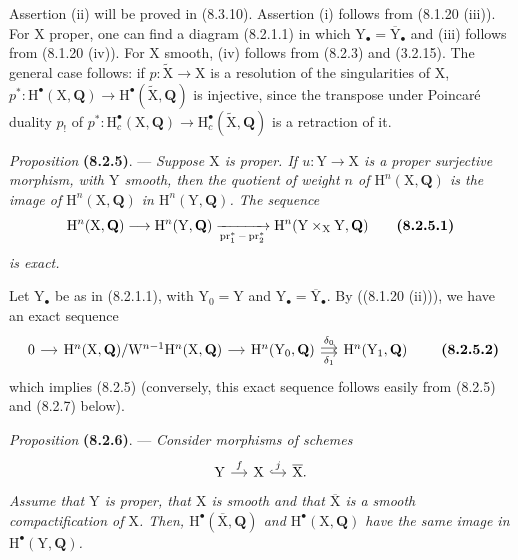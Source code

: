 \documentclass[11pt,leqno]{article}
\begin{document}
Assertion (ii) will be proved in (8.3.10). Assertion (i) follows from (8.1.20 (iii)). For \(\mathrm{X}\) proper, one can find a diagram (8.2.1.1) in which \(\mathrm{Y}_\bullet=\overline{\mathrm{Y}}_\bullet\) and (iii) follows from (8.1.20 (iv)). For \(\mathrm{X}\) smooth, (iv) follows from (8.2.3) and (3.2.15). The general case follows: if \(p:\widetilde{\mathrm{X}}\to\mathrm{X}\) is a resolution of the singularities of \(\mathrm{X}\), \(p^*:\mathrm{H}^\bullet(\mathrm{X},\mathbf{Q})\to\mathrm{H}^\bullet(\widetilde{\mathrm{X}},\mathbf{Q})\) is injective, since the transpose under Poincaré duality \(p_!\) of \(p^*:\mathrm{H}_c^\bullet(\mathrm{X},\mathbf{Q})\to\mathrm{H}_c^\bullet(\widetilde{\mathrm{X}},\mathbf{Q})\) is a retraction of it.

\textit{Proposition} \textbf{(8.2.5)}. — \textit{Suppose \(\mathrm{X}\) is proper. If \(u:\mathrm{Y}\to\mathrm{X}\) is a proper surjective morphism, with \(\mathrm{Y}\) smooth, then the quotient of weight \(n\) of \(\mathrm{H}^n(\mathrm{X},\mathbf{Q})\) is the image of \(\mathrm{H}^n(\mathrm{X},\mathbf{Q})\) in \(\mathrm{H}^n(\mathrm{Y},\mathbf{Q})\). The sequence}
\[
\mathrm{H}^n(\mathrm{X},\mathbf{Q})
\longrightarrow
\mathrm{H}^n(\mathrm{Y},\mathbf{Q})
\xrightarrow[\operatorname{pr}_1^*-\operatorname{pr}_2^*]{}
\mathrm{H}^n(\mathrm{Y}\times_{\mathrm{X}}\mathrm{Y},\mathbf{Q})
\tag*{\textbf{(8.2.5.1)}}
\]
\textit{is exact.}

Let \(\mathrm{Y}_\bullet\) be as in (8.2.1.1), with \(\mathrm{Y}_0=\mathrm{Y}\) and \(\mathrm{Y}_\bullet=\overline{\mathrm{Y}}_\bullet\). By ((8.1.20 (ii))), we have an exact sequence
\[
\begin{tikzcd}[column sep=small]
0 \arrow[r]
 & \mathrm{H}^n(\mathrm{X},\mathbf{Q})/
   \mathrm{W}^{n-1}\mathrm{H}^n(\mathrm{X},\mathbf{Q}) \arrow[r]
 & \mathrm{H}^n(\mathrm{Y}_0,\mathbf{Q})
   \arrow[r,shift left=.4ex,"\delta_0"]
   \arrow[r,shift right=.4ex,"\delta_1"']
 & \mathrm{H}^n(\mathrm{Y}_1,\mathbf{Q})
\end{tikzcd}
\tag*{\textbf{(8.2.5.2)}}
\]
which implies (8.2.5) (conversely, this exact sequence follows easily from (8.2.5) and (8.2.7) below).

\textit{Proposition} \textbf{(8.2.6)}. — \textit{Consider morphisms of schemes}
\[
\begin{tikzcd}[column sep=small]
\mathrm{Y} \arrow[r,"f"]
 & \mathrm{X} \arrow[r,hook,"j"]
 & \overline{\mathrm{X}}.
\end{tikzcd}
\]
\textit{Assume that \(\mathrm{Y}\) is proper, that \(\mathrm{X}\) is smooth and that \(\overline{\mathrm{X}}\) is a smooth compactification of \(\mathrm{X}\). Then,  \(\mathrm{H}^\bullet(\overline{\mathrm{X}},\mathbf{Q})\)  and \(\mathrm{H}^\bullet(\mathrm{X},\mathbf{Q})\) have the same image in \(\mathrm{H}^\bullet(\mathrm{Y},\mathbf{Q})\).}
\end{document}
